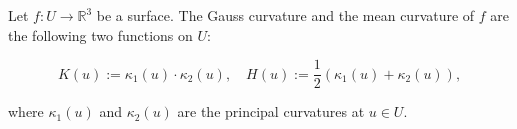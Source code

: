 Let $f: U \to \mathbb{R}^3$ be a surface. The Gauss curvature and the mean curvature of $f$ are the following two functions on $U$:

$$K(u) := \kappa_1(u) \cdot \kappa_2(u), \quad H(u) := \frac{1}{2}(\kappa_1(u) + \kappa_2(u)),$$

where $\kappa_1(u)$ and $\kappa_2(u)$ are the principal curvatures at $u \in U$.
